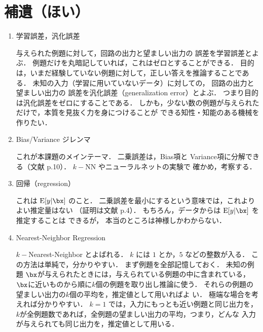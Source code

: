 \documentclass[a4paper,11pt]{jarticle}
\begin{document}
  
\section{補遺（ほい）}
\begin{enumerate}
 \item 学習誤差，汎化誤差
       
      与えられた例題に対して，回路の出力と望ましい出力の
      誤差を学習誤差とよぶ．
      例題だけを丸暗記していれば，これはゼロとすることができる．
      目的は，いまだ経験していない例題に対して，正しい答えを推論することである．
      未知の入力（学習に用いていないデータ）に対しての，
      回路の出力と望ましい出力の
      誤差を汎化誤差（generalization error）とよぶ．
      つまり目的は汎化誤差をゼロにすることである．
      しかも，少ない数の例題が与えられただけで，本質を見抜く力を身につけることが
      できる知性・知能のある機械を作りたい．

 \item Bias/Variance ジレンマ

       これが本課題のメインテーマ．
       二乗誤差は，Bias項と 
       Variance項に分解できる（文献\cite{sgeman92a} p.10）．
       $k-$NN やニューラルネットの実験で
       確かめ，考察する．
       
 \item 回帰（regression）

       これは $ {\rm E }  [y | \bx]   $ のこと．
       二乗誤差を最小にするという意味では，これよりよい推定量はない
       （証明は文献\cite{sgeman92a} p.4）．
       もちろん，データからは $ {\rm E }  [y | \bx]   $ を推定することは
       できるが，
       本当のところは神様しかわからない．
       
 \item Nearest-Neighbor Regression

       $k-$Nearest-Neighbor とよばれる．
       $k$ には $1$ とか，$5$ などの整数が入る．
       この方法は単純で，分かりやすい．
       まず例題を全部記憶しておく．
       未知の例題 $\bx$が与えられたときには，与えられている例題の中に含まれている，
       $\bx$に近いものから順に$k$個の例題を取り出し推論に使う．
       それらの例題の望ましい出力の$k$個の平均を，推定値として用いればよ
       い．
       極端な場合を考えれば分かりやすい．
       $k=1$ では，入力にもっとも近い例題と同じ出力を，
       $k$が全例題数であれば，全例題の望ましい出力の平均，つまり，どんな
       入力が与えられても同じ出力を，推定値として用いる．
              

\end{enumerate}
\end{document}
